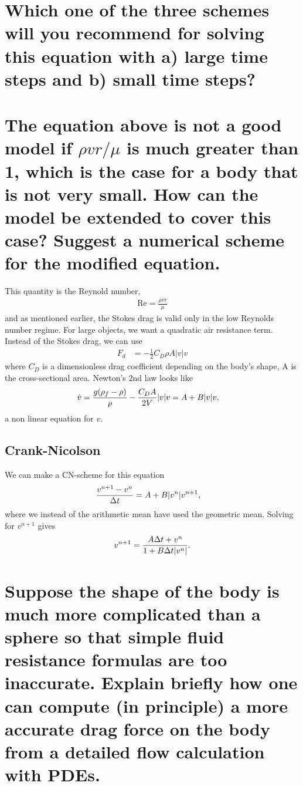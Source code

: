 \documentclass[a4paper,10pt]{article}
\renewcommand{\(}{\left(}
\renewcommand{\)}{\right)}
\begin{document}
\section{Which one of the three schemes will you recommend for solving this equation with a) large time steps and b) small time steps?}

\section{The equation above is not a good model if $\rho vr/\mu$ is much greater than 1, which is the case for a body that is not very small. How can the model be extended to cover this case? Suggest a numerical scheme for the modified equation.}
This quantity is the Reynold number,
\begin{align*}
  \text{Re} = \frac{\rho v r}{\mu}
\end{align*}
and as mentioned earlier, the Stokes drag is valid only in the low Reynolds number regime. For large objects, we want a quadratic air resistance term. Instead of the Stokes drag, we can use 
\begin{align*}
  F_d &= -\frac{1}{2}C_D \rho A |v|v
\end{align*}
where $C_D$ is a dimensionless drag coefficient depending on the body's shape, A is the cross-sectional area. Newton's 2nd law looks like
\begin{align*}
  \dot v &= {g(\rho_f - \rho) \over \rho} -\frac{C_DA}{2V}|v|v = A + B|v|v,
\end{align*}
a non linear equation for $v$.
\subsection{Crank-Nicolson}
We can make a CN-scheme for this equation
\begin{align*}
  {v^{n+1} - v^n \over \Delta t} &= A + B|v^n|v^{n+1},
\end{align*}
where we instead of the arithmetic mean have used the geometric mean. Solving for $v^{n+1}$ gives
\begin{align*}
  v^{n+1} = {A\Delta t + v^n \over 1 + B\Delta t|v^n|}.
\end{align*}
\section{Suppose the shape of the body is much more complicated than a sphere so that simple fluid resistance formulas are too inaccurate. Explain briefly how one can compute (in principle) a more accurate drag force on the body from a detailed flow calculation with PDEs.}
\end{document}
